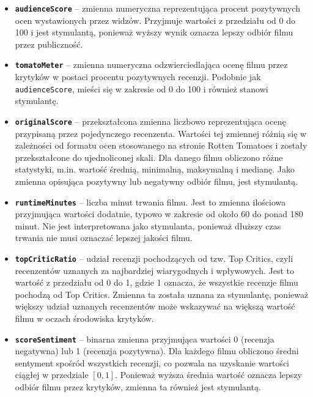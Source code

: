 \documentclass[a4paper,12pt,titlepage]{article}
\begin{document}
\begin{itemize}
    \item \textbf{\texttt{audienceScore}} – zmienna numeryczna reprezentująca procent pozytywnych ocen wystawionych przez widzów. Przyjmuje wartości z przedziału od 0 do 100 i jest stymulantą, ponieważ wyższy wynik oznacza lepszy odbiór filmu przez publiczność.

    \item \textbf{\texttt{tomatoMeter}} – zmienna numeryczna odzwierciedlająca ocenę filmu przez krytyków w postaci procentu pozytywnych recenzji. Podobnie jak \texttt{audienceScore}, mieści się w zakresie od 0 do 100 i również stanowi stymulantę.

    \item \textbf{\texttt{originalScore}} – przekształcona zmienna liczbowo reprezentująca ocenę przypisaną przez pojedynczego recenzenta. Wartości tej zmiennej różnią się w zależności od formatu ocen stosowanego na stronie Rotten Tomatoes i zostały przekształcone do ujednoliconej skali. Dla danego filmu obliczono różne statystyki, m.in. wartość średnią, minimalną, maksymalną i medianę. Jako zmienna opisująca pozytywny lub negatywny odbiór filmu, jest stymulantą.

    \item \textbf{\texttt{runtimeMinutes}} – liczba minut trwania filmu. Jest to zmienna ilościowa przyjmująca wartości dodatnie, typowo w zakresie od około 60 do ponad 180 minut. Nie jest interpretowana jako stymulanta, ponieważ dłuższy czas trwania nie musi oznaczać lepszej jakości filmu.

    \item \textbf{\texttt{topCriticRatio}} – udział recenzji pochodzących od tzw. Top Critics, czyli recenzentów uznanych za najbardziej wiarygodnych i wpływowych. Jest to wartość z przedziału od 0 do 1, gdzie 1 oznacza, że wszystkie recenzje filmu pochodzą od Top Critics. Zmienna ta została uznana za stymulantę, ponieważ większy udział uznanych recenzentów może wskazywać na większą wartość filmu w oczach środowiska krytyków.

    \item \textbf{\texttt{scoreSentiment}} – binarna zmienna przyjmująca wartości 0 (recenzja negatywna) lub 1 (recenzja pozytywna). Dla każdego filmu obliczono średni sentyment spośród wszystkich recenzji, co pozwala na uzyskanie wartości ciągłej w przedziale $[0, 1]$. Ponieważ wyższa średnia wartość oznacza lepszy odbiór filmu przez krytyków, zmienna ta również jest stymulantą.
\end{itemize}
\end{document}
